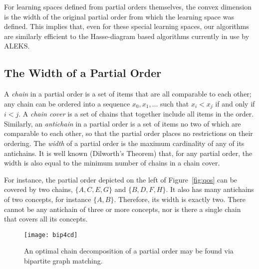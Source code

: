 \documentclass[11pt]{llncs}
\begin{document}
{For learning spaces defined from partial orders themselves, the convex dimension is the width of the original partial order from which the learning space was defined. This implies that, even for these special learning spaces, our algorithms are similarly efficient to the Hasse-diagram based algorithms currently in use by ALEKS.

\subsection{The Width of a Partial Order}

A \emph{chain} in a partial order is a set of items that are all comparable to each other; any chain can be ordered into a sequence $x_0,x_1,\ldots$ such that $x_i<x_j$ if and only if $i<j$. A \emph{chain cover} is a set of chains that together include all items in the order.
Similarly, an \emph{antichain} in a partial order is a set of items no two of which are comparable to each other, so that the partial order places no restrictions on their ordering.
The \emph{width} of a partial order is the maximum cardinality of any of its antichains.
It is well known (Dilworth's Theorem) that, for any partial order, the width is also equal to the minimum number of chains in a chain cover.

For instance, the partial order depicted on the left of Figure~\ref{fig:qos} can be covered by two chains, $\{A,C,E,G\}$ and $\{B,D,F,H\}$. It also has many antichains of two concepts, for instance $\{A,B\}$. Therefore, its width is exactly two. There cannot be any antichain of three or more concepts, nor is there a single chain that covers all its concepts.

\begin{figure}[t]
\centering\texttt{[image: bip4cd]}
\caption{An optimal chain decomposition of a partial order may be found via bipartite graph matching.}
\label{fig:bip4cd}
\end{figure}

}
\end{document}
